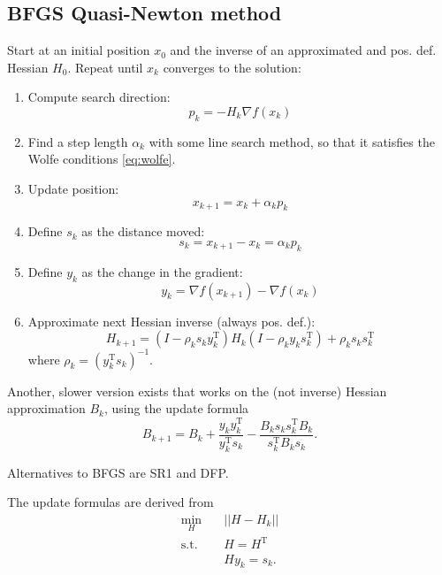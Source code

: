 \documentclass[a4paper, 12pt]{article}
\theoremstyle{definition}
\newcommand{\T}{^{\scriptscriptstyle \text{T}}}
\begin{document}
\subsection{BFGS Quasi-Newton method}
Start at an initial position \(x_0\) and the inverse of an approximated and pos. def. Hessian \(H_0\). Repeat until \(x_k\) converges to the solution:
\begin{enumerate}
	\item Compute search direction:
		\begin{equation}
			p_k = - H_k \nabla f(x_k)
		\end{equation}
	\item Find a step length \( \alpha_k \) with some line search method, so that it satisfies the Wolfe conditions \eqref{eq:wolfe}.
	\item Update position:
		\begin{equation}
			x_{k+1} = x_k + \alpha_k p_k
		\end{equation}
	\item Define \(s_k\) as the distance moved:
		\begin{equation}
			s_k = x_{k+1} - x_k = \alpha_k p_k
		\end{equation}
	\item Define \(y_k\) as the change in the gradient:
		\begin{equation}
			y_k = \nabla f(x_{k+1}) - \nabla f(x_k)
		\end{equation}
	\item
		Approximate next Hessian inverse (always pos. def.):
		\begin{equation}
			H_{k+1} = \left( I - \rho_k s_k y_k\T \right) H_k \left( I - \rho_k y_k s_k\T \right) + \rho_k s_k s_k\T
		\end{equation}
		where \( \rho_k = \left( y_k\T s_k \right)^{-1} \).
\end{enumerate}
Another, slower version exists that works on the (not inverse) Hessian approximation \(B_k\), using the update formula
\begin{equation}
	B_{k+1} = B_k + \frac{y_k y_k\T}{y_k\T s_k} - \frac{B_k s_k s_k\T B_k}{s_k\T B_k s_k}
	.
\end{equation}

Alternatives to BFGS are SR1 and DFP.

The update formulas are derived from
\begin{equation}
	\begin{aligned}
		\underset{H}{\min}	& \quad || H - H_k || \\
		\text{s.t.}	        & \quad H = H\T       \\
                            & \quad H y_k = s_k.
	\end{aligned}
\end{equation}
\end{document}
